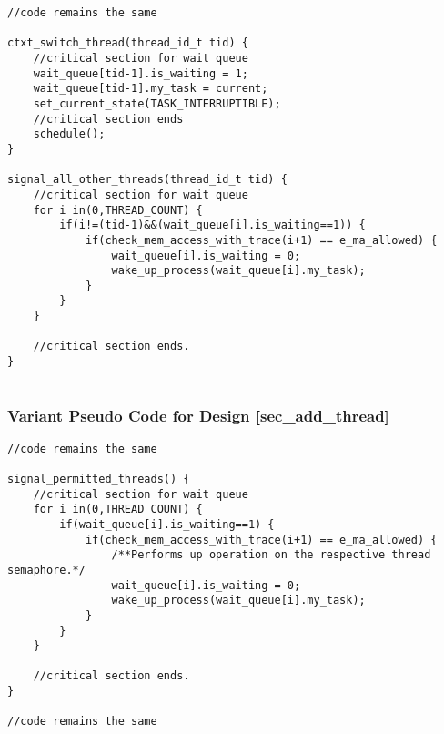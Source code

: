 \begin{lstlisting}[title=Kernel Space - IOCTL, style=customc]
//code remains the same

ctxt_switch_thread(thread_id_t tid) {	
	//critical section for wait queue
	wait_queue[tid-1].is_waiting = 1;
	wait_queue[tid-1].my_task = current;
	set_current_state(TASK_INTERRUPTIBLE);
	//critical section ends
	schedule();
}

signal_all_other_threads(thread_id_t tid) {
	//critical section for wait queue
	for i in(0,THREAD_COUNT) {
		if(i!=(tid-1)&&(wait_queue[i].is_waiting==1)) {
			if(check_mem_access_with_trace(i+1) == e_ma_allowed) {
				wait_queue[i].is_waiting = 0;
				wake_up_process(wait_queue[i].my_task);				
			}		
		}
	}	
	
	//critical section ends.
}


\end{lstlisting}

\subsubsection*{Variant Pseudo Code for Design \ref{sec_add_thread}}

\begin{lstlisting}[title=Kernel Space - General module definitions, style=customc]
//code remains the same

signal_permitted_threads() {
	//critical section for wait queue
	for i in(0,THREAD_COUNT) {
		if(wait_queue[i].is_waiting==1) {
			if(check_mem_access_with_trace(i+1) == e_ma_allowed) {
				/**Performs up operation on the respective thread semaphore.*/
				wait_queue[i].is_waiting = 0;
				wake_up_process(wait_queue[i].my_task);	
			}		
		}
	}	
	
	//critical section ends.
}

//code remains the same
\end{lstlisting}
